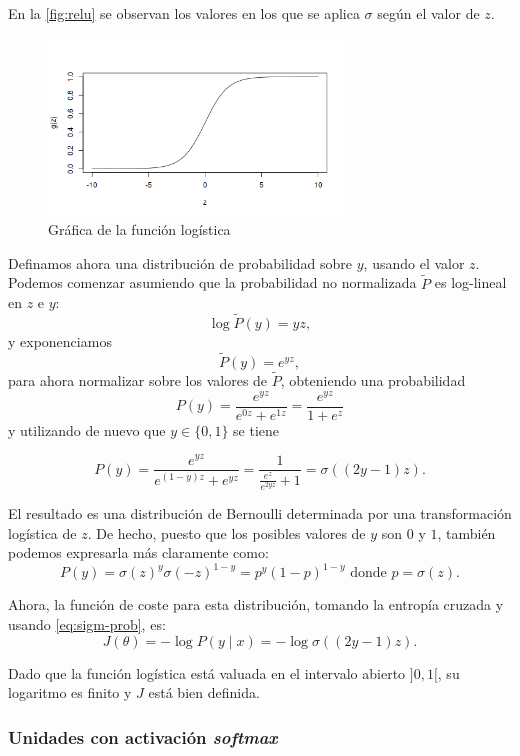 En la \autoref{fig:relu} se observan los valores en los que se aplica $\sigma$ según el valor de $z$.

\begin{figure}[hbtp]
  \centering
  \includegraphics[width=0.7\textwidth]{images/sigmoid.png}
  \caption[Logística]{Gráfica de la función logística}
  \label{fig:sigm}
\end{figure}

Definamos ahora una distribución de probabilidad sobre \(y\), usando el
valor \(z\). Podemos comenzar asumiendo que la probabilidad no
normalizada \(\tilde P\) es log-lineal en \(z\) e \(y\):
\[\log \tilde P(y)=yz,\] y exponenciamos \[\tilde P(y)=e^{yz},\] para
ahora normalizar sobre los valores de \(\tilde P\), obteniendo una
probabilidad \[P(y)=\frac{e^{yz}}{e^{0z}+e^{1z}}=\frac{e^{yz}}{1+e^z}\]
y utilizando de nuevo que \(y\in\{0,1\}\) se tiene

\begin{equation}\label{eq:sigm-prob}
  P(y)=\frac{e^{yz}}{e^{(1-y)z}+e^{yz}}=\frac{1}{\frac{e^{z}}{e^{2yz}}+1}=\sigma((2y-1)z).
\end{equation}

El resultado es una distribución de Bernoulli determinada por una
transformación logística de \(z\). De hecho, puesto que los posibles
valores de \(y\) son $0$ y $1$, también podemos expresarla más claramente
como:
\[P(y)=\sigma(z)^y\sigma(-z)^{1-y}=p^y(1-p)^{1-y}\mbox{ donde }p=\sigma(z).\]

Ahora, la función de coste para esta distribución, tomando la entropía
cruzada y usando \eqref{eq:sigm-prob}, es:
\[J(\theta)=-\log P(y\mid x)=-\log\sigma((2y-1)z).\]

Dado que la función logística está valuada en el intervalo abierto
\(]0,1[\), su logaritmo es finito y \(J\) está bien definida.

\subsubsection{\texorpdfstring{Unidades con activación
\emph{softmax}}{Unidades con activación softmax}}\label{unidades-con-activaciuxf3n-softmax}

